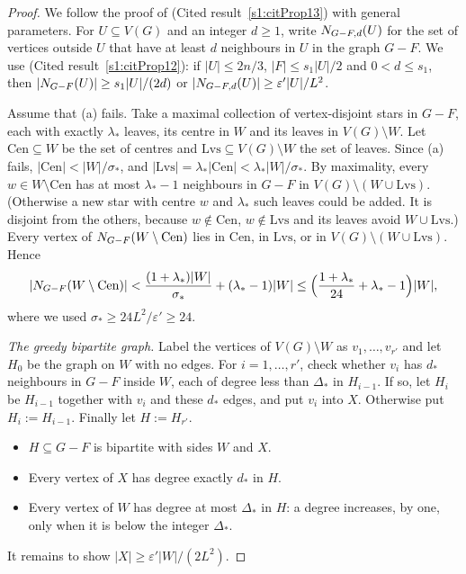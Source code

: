\begin{proof}
We follow the proof of \cite[Proposition~13]{BM}
(Cited result~\ref{s1:citProp13}) with general parameters. For $U\subseteq
V(G)$ and an integer $d\ge1$, write $N_{G-F,d}(U)$ for the set of
vertices outside $U$ that have at least $d$ neighbours in $U$ in the
graph $G-F$. We use \cite[Proposition~12]{BM} (Cited result~\ref{s1:citProp12}):
if $|U|\le 2n/3$, $|F|\le s_1|U|/2$ and $0<d\le s_1$, then
$|N_{G-F}(U)|\ge s_1|U|/(2d)$ or
$|N_{G-F,d}(U)|\ge\varepsilon'|U|/L^2$.

Assume that (a) fails. Take a maximal collection of vertex-disjoint stars
in $G-F$, each with exactly $\lambda_*$ leaves, its centre in $W$ and its
leaves in $V(G)\setminus W$. Let $\mathrm{Cen}\subseteq W$ be the set of
centres and $\mathrm{Lvs}\subseteq V(G)\setminus W$ the set of leaves.
Since (a) fails, $|\mathrm{Cen}|<|W|/\sigma_*$, and
$|\mathrm{Lvs}|=\lambda_*|\mathrm{Cen}|<\lambda_*|W|/\sigma_*$.
By maximality, every $w\in W\setminus\mathrm{Cen}$ has at most
$\lambda_*-1$ neighbours in $G-F$ in $V(G)\setminus(W\cup\mathrm{Lvs})$.
(Otherwise a new star with centre $w$ and $\lambda_*$ such leaves could be
added. It is disjoint from the others, because $w\notin\mathrm{Cen}$,
$w\notin\mathrm{Lvs}$ and its leaves avoid $W\cup\mathrm{Lvs}$.) Every
vertex of $N_{G-F}(W\setminus\mathrm{Cen})$ lies in $\mathrm{Cen}$, in
$\mathrm{Lvs}$, or in $V(G)\setminus(W\cup\mathrm{Lvs})$. Hence
\begin{equation}\label{s3:eqP13a}
|N_{G-F}(W\setminus\mathrm{Cen})|
<\frac{(1+\lambda_*)|W|}{\sigma_*}+(\lambda_*-1)|W|
\le\Big(\frac{1+\lambda_*}{24}+\lambda_*-1\Big)|W| ,
\end{equation}
where we used $\sigma_*\ge 24L^2/\varepsilon'\ge24$.

\smallskip\noindent\emph{The greedy bipartite graph.} Label the vertices
of $V(G)\setminus W$ as $v_1,\dots,v_{r'}$ and let $H_0$ be the graph on
$W$ with no edges. For $i=1,\dots,r'$, check whether $v_i$ has $d_*$
neighbours in $G-F$ inside $W$, each of degree less than $\Delta_*$ in
$H_{i-1}$. If so, let $H_i$ be $H_{i-1}$ together with $v_i$ and these
$d_*$ edges, and put $v_i$ into $X$. Otherwise put $H_i:=H_{i-1}$.
Finally let $H:=H_{r'}$.
\begin{itemize}
\item $H\subseteq G-F$ is bipartite with sides $W$ and $X$.
\item Every vertex of $X$ has degree exactly $d_*$ in $H$.
\item Every vertex of $W$ has degree at most $\Delta_*$ in $H$: a degree
  increases, by one, only when it is below the integer $\Delta_*$.
\end{itemize}
It remains to show $|X|\ge\varepsilon'|W|/(2L^2)$.


\end{proof}
